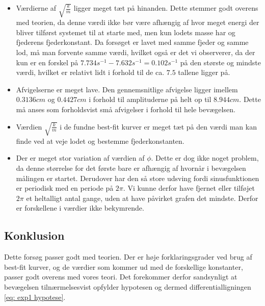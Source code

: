 \begin{itemize}

\item Værdierne af $\sqrt{\frac{k}{m}}$ ligger meget tæt på hinanden. 
Dette stemmer godt overens med teorien, da denne værdi ikke bør være afhængig af hvor meget energi der bliver tilførst systemet til at starte med, men kun lodets masse har og fjederens fjederkonstant. 
Da forsøget er lavet med samme fjeder og samme lod, må man forvente samme værdi, hvilket også er det vi observerer, da der kun er en forskel på $7.734s^{-1}-7.632s^{-1}=0.102s^{-1}$ på den største og mindste værdi, hvilket er relativt lidt i forhold til de ca. $7.5$ tallene ligger på.



\item Afvigelserne er meget lave. 
Den gennemsnitlige afvigelse ligger imellem $0.3136cm$ og $0.4427cm$ i forhold til amplituderne på helt op til $8.944cm$. 
Dette må anses som forholdsvist små afvigelser i forhold til hele bevægelsen.



\item Værdien $\sqrt{\frac{k}{m}}$ i de fundne best-fit kurver er meget tæt på den værdi man kan finde ved at veje lodet og bestemme fjederkonstanten.



\item Der er meget stor variation af værdien af $\phi$.
Dette er dog ikke noget problem, da denne størrelse for det første bare er afhængig af hvornår i bevægelsen målingen er startet.
Derudover har den så store udsving fordi sinusfunktionen er periodisk med en periode på $2\pi$.
Vi kunne derfor have fjernet eller tilføjet $2\pi$ et heltalligt antal gange, uden at have påvirket grafen det mindste. 
Derfor er forskellene i værdier ikke bekymrende. 


\end{itemize}

\subsection{Konklusion}
Dette forsøg passer godt med teorien. 
Der er høje forklaringsgrader ved brug af best-fit kurver, og de værdier som kommer ud med de forskellige konstanter, passer godt overens med vores teori.
Det forekommer derfor sandsynligt at bevægelsen tilnærmelsesvist opfylder hypotesen og dermed differentialligningen \ref{eq: exp1 hypotese}.

